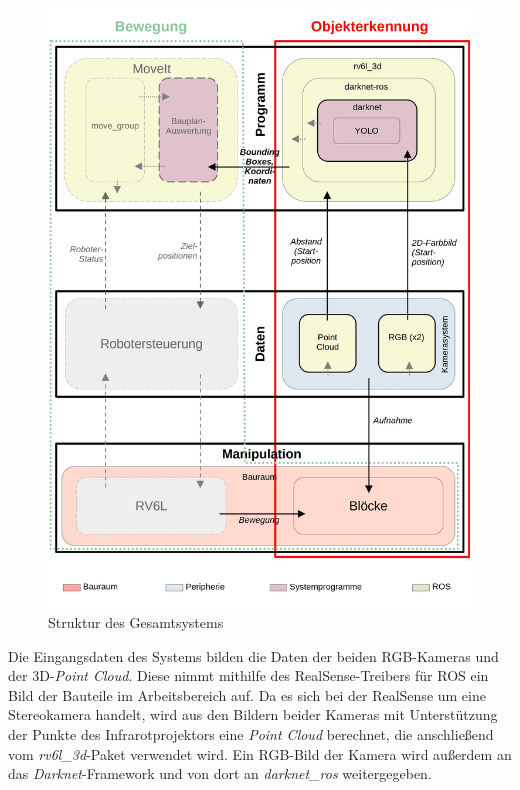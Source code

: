 \begin{figure}[ht]
    \centering
    \includegraphics[width=\textwidth]{Bilder/gesamtsystem_struktur.jpg}
    \caption{Struktur des Gesamtsystems}
    \label{fig:gesamtsystem_struktur}
\end{figure}

Die Eingangsdaten des Systems bilden die Daten der beiden RGB-Kameras und der 3D-\textit{Point Cloud}. Diese nimmt mithilfe des RealSense-Treibers für \ac{ROS} ein Bild der Bauteile im Arbeitsbereich auf. Da es sich bei der RealSense um eine Stereokamera handelt, wird aus den Bildern beider Kameras mit Unterstützung der Punkte des Infrarotprojektors eine \textit{Point Cloud} berechnet, die anschließend vom \textit{rv6l\_3d}-Paket verwendet wird. Ein RGB-Bild der Kamera wird außerdem an das \textit{Darknet}-Framework und von dort an \textit{darknet\_ros} weitergegeben.

